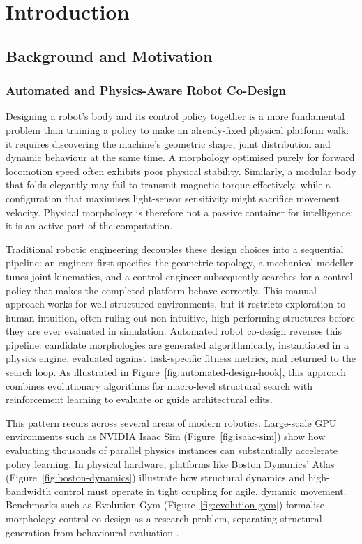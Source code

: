 \documentclass[12pt,a4paper]{report}
\begin{document}
\thispagestyle{empty}


\chapter{Introduction}
\label{ch:introduction}
\setcounter{page}{1}


\section{Background and Motivation}

\subsection{Automated and Physics-Aware Robot Co-Design}

Designing a robot's body and its control policy together is a more fundamental problem than training a policy to make an already-fixed physical platform walk: it requires discovering the machine's geometric shape, joint distribution and dynamic behaviour at the same time. A morphology optimised purely for forward locomotion speed often exhibits poor physical stability. Similarly, a modular body that folds elegantly may fail to transmit magnetic torque effectively, while a configuration that maximises light-sensor sensitivity might sacrifice movement velocity. Physical morphology is therefore not a passive container for intelligence; it is an active part of the computation.

Traditional robotic engineering decouples these design choices into a sequential pipeline: an engineer first specifies the geometric topology, a mechanical modeller tunes joint kinematics, and a control engineer subsequently searches for a control policy that makes the completed platform behave correctly. This manual approach works for well-structured environments, but it restricts exploration to human intuition, often ruling out non-intuitive, high-performing structures before they are ever evaluated in simulation. Automated robot co-design reverses this pipeline: candidate morphologies are generated algorithmically, instantiated in a physics engine, evaluated against task-specific fitness metrics, and returned to the search loop. As illustrated in Figure~\ref{fig:automated-design-hook}, this approach combines evolutionary algorithms for macro-level structural search with reinforcement learning to evaluate or guide architectural edits.

This pattern recurs across several areas of modern robotics. Large-scale GPU environments such as NVIDIA Isaac Sim (Figure~\ref{fig:isaac-sim}) show how evaluating thousands of parallel physics instances can substantially accelerate policy learning. In physical hardware, platforms like Boston Dynamics' Atlas (Figure~\ref{fig:boston-dynamics}) illustrate how structural dynamics and high-bandwidth control must operate in tight coupling for agile, dynamic movement. Benchmarks such as Evolution Gym (Figure~\ref{fig:evolution-gym}) formalise morphology-control co-design as a research problem, separating structural generation from behavioural evaluation \citep{bhatia2021evolution,li2023modular,yang2024machine}.
\end{document}
